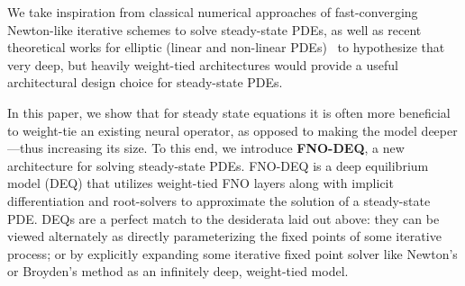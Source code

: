 We take inspiration from classical numerical approaches of fast-converging Newton-like iterative schemes 
\citep{leveque2007finite, farago2002numerical}
to solve steady-state PDEs, as well as recent theoretical works for elliptic (linear and non-linear PDEs)~\citep{marwah2021parametric, chen2021representation, marwah2022neural} to hypothesize that very deep, but heavily weight-tied architectures would provide a useful 
architectural design choice for steady-state PDEs.

In this paper, we show that for steady state equations
it is often more beneficial to weight-tie
an existing neural operator, 
as opposed to making the model deeper---thus increasing its size.
To this end, we introduce {\bf FNO-DEQ}, a new architecture for solving steady-state PDEs. FNO-DEQ 
is a deep equilibrium model (DEQ)
that utilizes weight-tied FNO layers along with 
implicit differentiation and root-solvers to approximate the solution of a steady-state PDE.
DEQs are a perfect match to the desiderata laid out above: they can be viewed alternately 
as directly parameterizing the fixed points 
of some iterative process; or
by explicitly expanding some iterative fixed point solver like 
Newton's or Broyden's method as an infinitely deep, weight-tied model.

